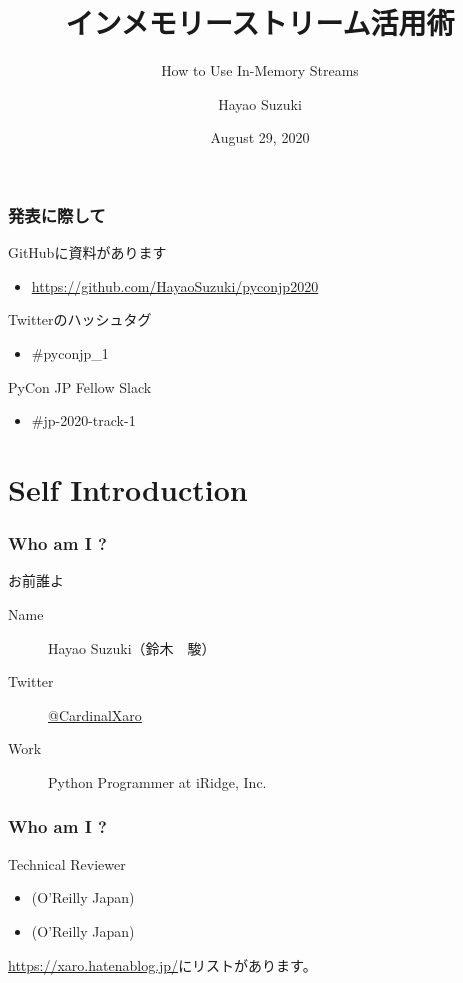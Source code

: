 \documentclass[aspectratio=169,dvipdfmx,14pt,notheorems]{beamer}
\title{インメモリーストリーム活用術}
\subtitle{How to Use In-Memory Streams}
\author[Hayao]{Hayao Suzuki}
\institute[PyCon JP 2020]{PyCon JP 2020}
\date{August 29, 2020}
\theoremstyle{definition}
\begin{document}
\begin{frame}[plain]\frametitle{}
\titlepage %
\end{frame}

\begin{frame}\frametitle{発表に際して}

\begin{block}{GitHubに資料があります}
\begin{itemize}
\item \url{https://github.com/HayaoSuzuki/pyconjp2020}
\end{itemize}
\end{block}

\begin{block}{Twitterのハッシュタグ}
\begin{itemize}
\item \#pyconjp\_1
\end{itemize}
\end{block}

\begin{block}{PyCon JP Fellow Slack}
\begin{itemize}
\item \#jp-2020-track-1
\end{itemize}
\end{block}
\end{frame}

\section{Self Introduction}

\begin{frame}\frametitle{Who am I ?}

\begin{block}{お前誰よ}
\begin{description}
\item[Name] Hayao Suzuki（鈴木　駿）
\item[Twitter] \href{https://twitter.com/CardinalXaro}{@CardinalXaro}
\item[Work] Python Programmer at iRidge, Inc.
\end{description}
\end{block}

\end{frame}

\begin{frame}\frametitle{Who am I ?}

\begin{block}{Technical Reviewer}
\begin{itemize}
\item {}(O'Reilly Japan)
\item {}(O'Reilly Japan)
\end{itemize}
\end{block}
\url{https://xaro.hatenablog.jp/}にリストがあります。
\end{frame}
\end{document}

